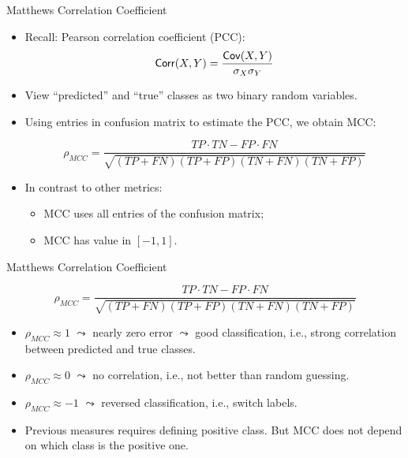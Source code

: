 \documentclass[11pt,compress,t,notes=noshow, xcolor=table]{beamer}
\begin{document}
\begin{vbframe}{Matthews Correlation Coefficient}

	\small{
    	\begin{itemize}
    
            \item Recall: Pearson correlation coefficient (PCC): 
                $$\mathsf{Corr}(X, Y) = \frac{\mathsf{Cov}(X, Y)}{\sigma_{X} \sigma_{Y}}$$
    		\item View ``predicted'' and ``true'' classes as two binary random variables.
      
            \item Using entries in confusion matrix to estimate the PCC, we obtain MCC:
    	
    		$$   \rho_{MCC} = \frac{TP\cdot TN - FP \cdot FN}{\sqrt{(TP+FN)(TP+FP)(TN+FN)(TN+FP)}}$$
    
            \item In contrast to other metrics: 
            \begin{itemize}
                \footnotesize
                \item MCC uses all entries of the confusion matrix;
                \item MCC has value in $[-1,1]$.
            \end{itemize}
    		
        \end{itemize}
    	
	}
\end{vbframe}

\begin{vbframe}{Matthews Correlation Coefficient}
    \small{
        $$   \rho_{MCC} = \frac{TP\cdot TN - FP \cdot FN}{\sqrt{(TP+FN)(TP+FP)(TN+FN)(TN+FP)}}$$

        \begin{itemize}
            \item $\rho_{MCC} \approx 1$ $\leadsto$ nearly zero error $\leadsto$ good classification, i.e., strong correlation between predicted and true classes.
            \vspace{10pt}
    	
            \item $\rho_{MCC} \approx 0$ $\leadsto$ no correlation, i.e., not better than random guessing.
            \vspace{10pt}
    	
            \item $\rho_{MCC} \approx -1$ $\leadsto$ reversed classification, i.e., switch labels.
            \vspace{10pt}
    
            \item Previous measures requires defining positive class. But MCC does not depend on which class is the positive one.
            
        \end{itemize}
         
    }
    
\end{vbframe}
\end{document}
